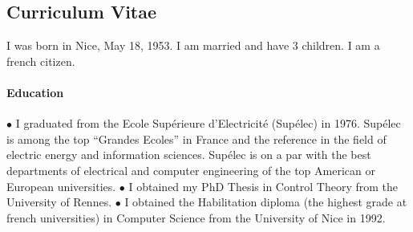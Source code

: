 









\subsection{Curriculum Vitae}

I was born in Nice, May 18, 1953. I am married and have 3 children. I am a french citizen.

\paragraph{Education}\mbox{}

$\bullet$ I graduated from the Ecole Sup\'erieure d'Electricit\'e (Sup\'elec) in 1976.  Sup\'elec is among the top ``Grandes Ecoles'' in France and the reference in the field of electric energy and information sciences. Sup\'elec is on a par with the best departments of electrical and computer engineering of the top American or European universities.
$\bullet$
I obtained my PhD Thesis in Control Theory from the University of Rennes. 
$\bullet$
I obtained the Habilitation diploma (the highest grade at french universities) in Computer Science from the  University of Nice in 1992.

